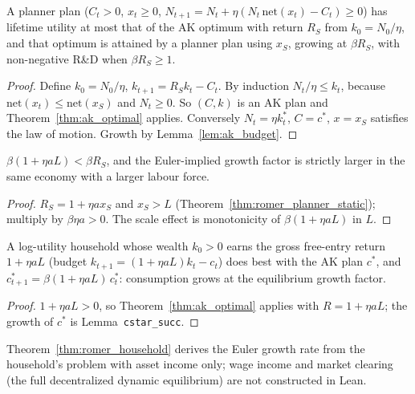 \begin{theorem}
\label{thm:romer_planner}
\leanok
{}
A planner plan ($C_t > 0$, $x_t \ge 0$, $N_{t+1} = N_t + \eta(N_t\,\mathrm{net}(x_t) - C_t) \ge 0$) has lifetime utility
at most that of the AK optimum with return $R_S$ from $k_0 = N_0/\eta$, and that optimum is attained by a planner plan
using $x_S$, growing at $\beta R_S$, with non-negative R\&D when $\beta R_S \ge 1$.
\end{theorem}
\begin{proof}
\leanok
Define $k_0 = N_0/\eta$, $k_{t+1} = R_Sk_t - C_t$. By induction $N_t/\eta \le k_t$, because
$\mathrm{net}(x_t) \le \mathrm{net}(x_S)$ and $N_t \ge 0$. So $(C, k)$ is an AK plan and Theorem~\ref{thm:ak_optimal}
applies. Conversely $N_t = \eta k^*_t$, $C = c^*$, $x = x_S$ satisfies the law of motion. Growth by
Lemma~\ref{lem:ak_budget}.
\end{proof}

\begin{theorem}
\label{thm:romer_growth}
\leanok
{}
$\beta(1 + \eta aL) < \beta R_S$, and the Euler-implied growth factor is strictly larger in the same economy with a
larger labour force.
\end{theorem}
\begin{proof}
\leanok
$R_S = 1 + \eta a x_S$ and $x_S > L$ (Theorem~\ref{thm:romer_planner_static}); multiply by $\beta\eta a > 0$. The scale
effect is monotonicity of $\beta(1 + \eta aL)$ in $L$.
\end{proof}

\begin{theorem}
\label{thm:romer_household}
\leanok
{}
A log-utility household whose wealth $k_0 > 0$ earns the gross free-entry return $1 + \eta aL$ (budget
$k_{t+1} = (1 + \eta aL)k_t - c_t$) does best with the AK plan $c^*$, and $c^*_{t+1} = \beta(1 + \eta aL)\,c^*_t$:
consumption grows at the equilibrium growth factor.
\end{theorem}
\begin{proof}
\leanok
$1 + \eta aL > 0$, so Theorem~\ref{thm:ak_optimal} applies with $R = 1 + \eta aL$; the growth of $c^*$ is
Lemma~\texttt{cstar\_succ}.
\end{proof}

\begin{remark}
Theorem~\ref{thm:romer_household} derives the Euler growth rate from the household's problem with asset income
only; wage income and market clearing (the full decentralized dynamic equilibrium) are not constructed in Lean.
\end{remark}
